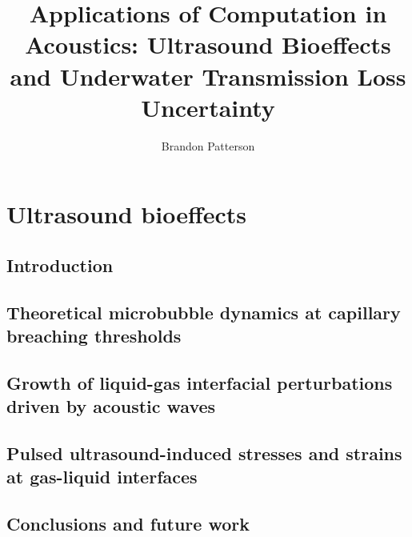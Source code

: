 \documentclass[submit]{./tex/thesis-umich}
\title{Applications of Computation in Acoustics: Ultrasound Bioeffects and Underwater Transmission Loss Uncertainty}
\author{Brandon Patterson}
\begin{document}
%


%
\acresetall

\renewcommand\thepart{Part~\Roman{part}:} %
\renewcommand\cftpartpresnum{Part~}
\part{Ultrasound bioeffects} \label{part:ultrasound_bioeffects}
%


\chapter{Introduction} \label{ch:Introduction}

% 

\chapter{Theoretical microbubble dynamics at capillary breaching thresholds}   \label{ch:usbe_bubble}%
%
%

\acresetall


\chapter{Growth of liquid-gas interfacial perturbations driven by acoustic waves} \label{ch:usbe_lung}%



\acresetall
\chapter{Pulsed ultrasound-induced stresses and strains at gas-liquid interfaces} \label{ch:usbe_lung_bio}%


\acresetall

\chapter{Conclusions and future work} \label{ch:usbe_conclusions}

\end{document}
